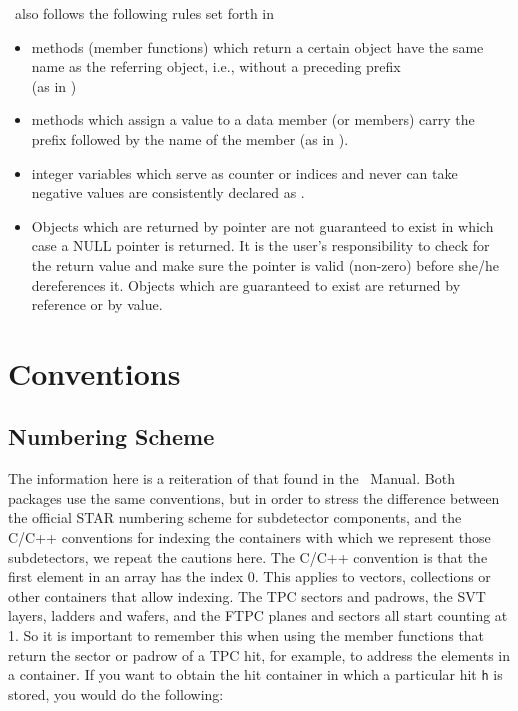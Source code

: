 \StMcEvent\ also follows the following rules set forth in \StEvent\ 
\begin{itemize}
\item methods (member functions) which return a certain object have
    the same name as the referring object, i.e., without a preceding
    \name{get} prefix \\ (as in \name{StMcEvent::primaryVertex()})
\item methods which assign a value to a data member (or members) carry
    the prefix \name{set} followed by the name of the member (as in ).
\item integer variables which serve as counter or indices and never
    can take negative values are consistently declared as
    .
\item Objects which are returned by pointer are not guaranteed to
    exist in which case a NULL pointer is returned. It is the user's
    responsibility to check for the return value and make sure the
    pointer is valid (non-zero) before she/he dereferences it.  Objects
    which are guaranteed to exist are returned by reference or by value.
\end{itemize}
\section{Conventions}
\subsection{Numbering Scheme}
\label{sec:numberscheme}
The information here is a reiteration of that found in the \StEvent\
Manual.  Both packages use the same conventions, but in order to
stress the difference between the official STAR numbering scheme
for subdetector components, and
the C/C++ conventions for indexing the containers with which we represent those
subdetectors, we repeat the cautions here.  The C/C++ convention
is that the first element in an array has the index 0.  This applies
to vectors, collections or other containers that allow indexing.
The TPC sectors and padrows,
the SVT layers, ladders and wafers, and the FTPC planes and sectors
all start counting at 1.  So it is important to remember this when
using the member functions that return the sector or padrow of a
TPC hit, for example, to address the elements in a container.  If
you want to obtain the hit container in which a particular hit
\verb+h+ is stored, you would do the following:

